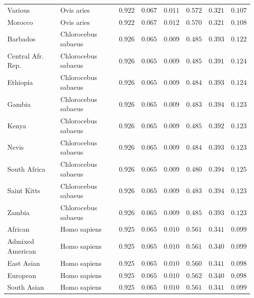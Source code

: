 \documentclass{article}
\begin{document}
\begin{center}
\begin{longtable*}{|l|l|r|r|r|r|r|r|}
            Various & Ovis aries & $ 0.922$ & $ 0.067$ & $ 0.011$ & $ 0.572$ & $ 0.321$ & $ 0.107$ \\
            Morocco & Ovis aries & $ 0.922$ & $ 0.067$ & $ 0.012$ & $ 0.570$ & $ 0.321$ & $ 0.108$ \\
             Barbados & Chlorocebus sabaeus & $ 0.926$ & $ 0.065$ & $ 0.009$ & $ 0.485$ & $ 0.393$ & $ 0.122$ \\
             Central Afr. Rep. & Chlorocebus sabaeus & $ 0.926$ & $ 0.065$ & $ 0.009$ & $ 0.485$ & $ 0.391$ & $ 0.124$ \\
             Ethiopia & Chlorocebus sabaeus & $ 0.926$ & $ 0.065$ & $ 0.009$ & $ 0.484$ & $ 0.393$ & $ 0.124$ \\
             Gambia & Chlorocebus sabaeus & $ 0.926$ & $ 0.065$ & $ 0.009$ & $ 0.483$ & $ 0.394$ & $ 0.123$ \\
             Kenya & Chlorocebus sabaeus & $ 0.926$ & $ 0.065$ & $ 0.009$ & $ 0.485$ & $ 0.392$ & $ 0.123$ \\
             Nevis & Chlorocebus sabaeus & $ 0.926$ & $ 0.065$ & $ 0.009$ & $ 0.484$ & $ 0.393$ & $ 0.123$ \\
             South Africa & Chlorocebus sabaeus & $ 0.926$ & $ 0.065$ & $ 0.009$ & $ 0.480$ & $ 0.394$ & $ 0.125$ \\
             Saint Kitts & Chlorocebus sabaeus & $ 0.926$ & $ 0.065$ & $ 0.009$ & $ 0.483$ & $ 0.394$ & $ 0.123$ \\
             Zambia & Chlorocebus sabaeus & $ 0.926$ & $ 0.065$ & $ 0.009$ & $ 0.485$ & $ 0.393$ & $ 0.123$ \\
            African & Homo sapiens & $ 0.925$ & $ 0.065$ & $ 0.010$ & $ 0.561$ & $ 0.341$ & $ 0.099$ \\
            Admixed American & Homo sapiens & $ 0.925$ & $ 0.065$ & $ 0.010$ & $ 0.561$ & $ 0.340$ & $ 0.099$ \\
            East Asian & Homo sapiens & $ 0.925$ & $ 0.065$ & $ 0.010$ & $ 0.560$ & $ 0.341$ & $ 0.098$ \\
            European & Homo sapiens & $ 0.925$ & $ 0.065$ & $ 0.010$ & $ 0.562$ & $ 0.340$ & $ 0.098$ \\
            South Asian & Homo sapiens & $ 0.925$ & $ 0.065$ & $ 0.010$ & $ 0.561$ & $ 0.341$ & $ 0.099$ \\
        \end{longtable*}
    \end{center}
\end{document}
